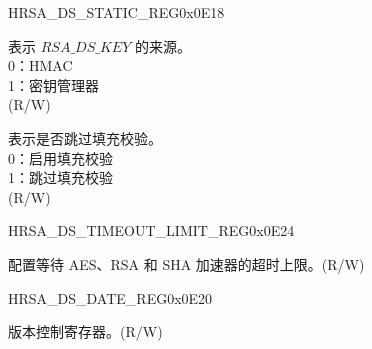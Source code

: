\begin{register}{H}{RSA\_DS\_STATIC\_REG}{0x0E18}\label{regdesc:RSADSSTATICREG}
%
%
%
\regnewline%
\begin{regdesc}\begin{reglist}
\label{fielddesc:RSADSKEYSOURCE}\item [RSA\_DS\_KEY\_SOURCE] 表示 \begin{math}RSA\_DS\_KEY\end{math} 的来源。\\
0：HMAC\\
1：密钥管理器\\
(R/W)
\label{fielddesc:RSADSSKIPPADDINGCHECK}\item [RSA\_DS\_SKIP\_PADDING\_CHECK] 表示是否跳过填充校验。\\
0：启用填充校验\\
1：跳过填充校验\\
(R/W)
\end{reglist}\end{regdesc}
\end{register}


\begin{register}{H}{RSA\_DS\_TIMEOUT\_LIMIT\_REG}{0x0E24}\label{regdesc:RSADSTIMEOUTLIMITREG}
%
\regnewline%
\begin{regdesc}\begin{reglist}
\label{fielddesc:RSADSTIMEOUTLIMIT}\item [RSA\_DS\_TIMEOUT\_LIMIT] 配置等待 AES、RSA 和 SHA 加速器的超时上限。(R/W)

\end{reglist}\end{regdesc}
\end{register}


\begin{register}{H}{RSA\_DS\_DATE\_REG}{0x0E20}\label{regdesc:RSADSDATEREG}
%
%
\regnewline%
\begin{regdesc}\begin{reglist}
\label{fielddesc:RSADSDATE}\item [RSA\_DS\_DATE] 版本控制寄存器。(R/W)
\end{reglist}\end{regdesc}
\end{register}

